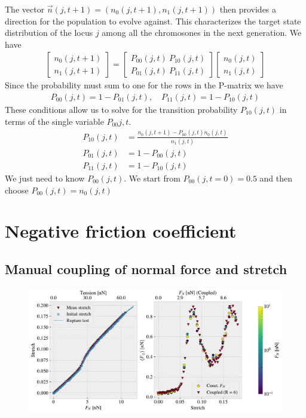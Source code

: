 The vector $\vec{n}(j,t+1)=(n_0(j, t+1), n_1(j, t+1))$ then provides a direction for the population to evolve against. This characterizes the target state distribution of the locus $j$ among all the chromosones in the next generation. We have
\begin{align*}
  \begin{bmatrix}
    n_0(j, t+1) \\
    n_1(j, t+1)
  \end{bmatrix}
  = 
  \begin{bmatrix}
    P_{00}(j,t) \ P_{10}(j,t) \\
    P_{01}(j,t) \ P_{11}(j,t)
  \end{bmatrix}
  \begin{bmatrix}
    n_0(j, t) \\
    n_1(j, t)
  \end{bmatrix}
\end{align*}
Since the probability must sum to one for the rows in the P-matrix we have 
\begin{align*}
  P_{00}(j, t) = 1 - P_{01}(j, t), \quad P_{11}(j, t) = 1 - P_{10}(j, t)
\end{align*}
These conditions allow us to solve for the transition probability $P_{10}(j,t)$ in terms of the single variable $P_{00}{j,t}$.
\begin{align*}
  P_{10}(j,t) &= \frac{n_0(j, t+1) - P_{00}(j,t)n_0(j, t)}{n_1(j,t)} \\
  P_{01}(j,t) &= 1 - P_{00}(j,t) \\
  P_{11}(j,t) &= 1 - P_{10}(j,t)
\end{align*}
We just need to know $P_{00}(j,t)$. We start from $P_{00}(j, t = 0) = 0.5$ and then choose $P_{00}(j,t) = n_0(j,t)$



\chapter{Negative friction coefficient}
\section{Manual coupling of normal force and stretch}

\begin{figure}[H]
  \centering
  \includegraphics[width=0.9\linewidth]{figures/negative_coefficient/manual_coupling_free_pop1_7_5.pdf}
  \caption{}
  \label{fig:nanomachine}
\end{figure}


